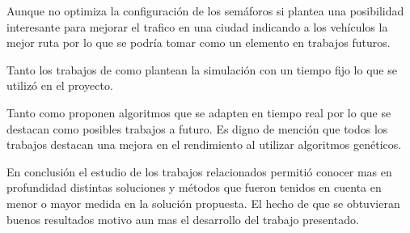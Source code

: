 Aunque \citet{Stolfi2012} no optimiza la configuración de los semáforos si plantea una posibilidad interesante para mejorar el trafico en una ciudad indicando a los vehículos la mejor ruta por lo que se podría tomar como un elemento en trabajos futuros.

Tanto los trabajos de \citet{Teo2010} como \citet{Stolfi2012} plantean la simulación con un tiempo fijo lo que se utilizó en el proyecto.

Tanto \citet{Montana1996} como \citet{Vogel2000}  proponen algoritmos que se adapten en tiempo real por lo que se destacan como posibles trabajos a futuro.
Es digno de mención que todos los trabajos destacan una mejora en el rendimiento al utilizar algoritmos genéticos. 

En conclusión el estudio de los trabajos relacionados permitió conocer mas en profundidad distintas soluciones y métodos que fueron tenidos en cuenta en menor o mayor medida en la solución propuesta. El hecho de que se obtuvieran buenos resultados motivo aun mas el desarrollo del trabajo presentado.





